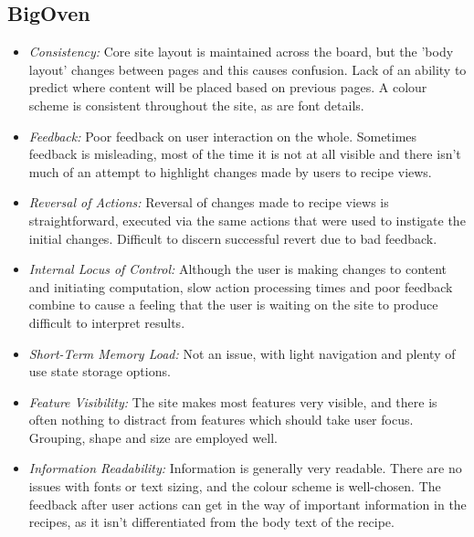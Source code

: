 \documentclass{article}
\begin{document}
\subsection*{BigOven}
\begin{itemize}
\item \emph{Consistency:} Core site layout is maintained across the board, but the 'body layout' changes between pages and this causes confusion. Lack of an ability to predict where content will be placed based on previous pages. A colour scheme is consistent throughout the site, as are font details.
\item \emph{Feedback:} Poor feedback on user interaction on the whole. Sometimes feedback is misleading, most of the time it is not at all visible and there isn't much of an attempt to highlight changes made by users to recipe views. 
\item \emph{Reversal of Actions:} Reversal of changes made to recipe views is straightforward, executed via the same actions that were used to instigate the initial changes. Difficult to discern successful revert due to bad feedback.
\item \emph{Internal Locus of Control:} Although the user is making changes to content and initiating computation, slow action processing times and poor feedback combine to cause a feeling that the user is waiting on the site to produce difficult to interpret results.
\item \emph{Short-Term Memory Load:} Not an issue, with light navigation and plenty of use state storage options.
\item \emph{Feature Visibility:} The site makes most features very visible, and there is often nothing to distract from features which should take user focus. Grouping, shape and size are employed well.
\item \emph{Information Readability:} Information is generally very readable. There are no issues with fonts or text sizing, and the colour scheme is well-chosen. The feedback after user actions can get in the way of important information in the recipes, as it isn't differentiated from the body text of the recipe.
\end{itemize}
\end{document}
